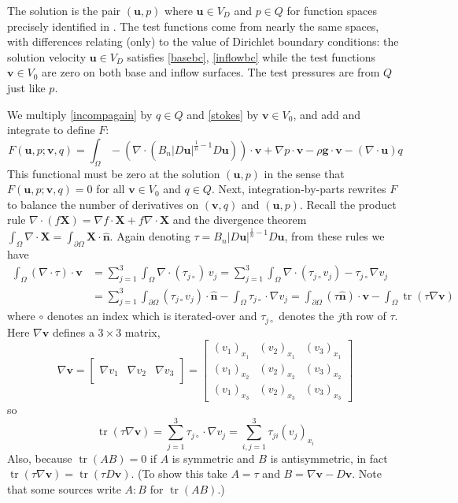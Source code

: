 \documentclass[letterpaper,final,12pt,reqno]{amsart}
\newcommand{\grad}{\nabla}
\newcommand{\trace}{\operatorname{tr}}
\newcommand{\hbn}{\hat{\mathbf{n}}}
\newcommand{\bu}{\mathbf{u}}
\newcommand{\bv}{\mathbf{v}}
\newcommand{\bX}{\mathbf{X}}
\begin{document}
The solution is the pair $(\bu,p)$ where $\bu\in V_D$ and $p \in Q$ for function spaces precisely identified in \cite{JouvetRappaz2011}.  The test functions come from nearly the same spaces, with differences relating (only) to the value of Dirichlet boundary conditions: the solution velocity $\bu\in V_D$ satisfies \eqref{basebc}, \eqref{inflowbc} while the test functions $\bv\in V_0$ are zero on both base and inflow surfaces.  The test pressures are from $Q$ just like $p$.

We multiply \eqref{incompagain} by $q\in Q$ and \eqref{stokes} by $\bv\in V_0$, and add and integrate to define $F$:
\begin{equation}
F(\bu,p;\bv,q) = \int_\Omega - \left(\nabla \cdot \left(B_n |D\bu|^{\frac{1}{n} - 1} D\bu\right)\right)\cdot \bv + \nabla p \cdot \bv - \rho \mathbf{g} \cdot \bv - \left(\nabla \cdot \bu\right) q \label{nonfuncone}
\end{equation}
This functional must be zero at the solution $(\bu,p)$ in the sense that $F(\bu,p;\bv,q) = 0$ for all  $\bv\in V_0$ and $q\in Q$.  Next, integration-by-parts rewrites $F$ to balance the number of derivatives on $(\bv,q)$ and $(\bu,p)$.  Recall the product rule $\nabla \cdot(f\bX) = \grad f\cdot \bX + f \nabla \cdot \bX$ and the divergence theorem $\int_\Omega \nabla \cdot \bX = \int_{\partial \Omega} \bX \cdot \hbn$.  Again denoting $\tau = B_n |D\bu|^{\frac{1}{n} - 1} D\bu$, from these rules we have
\begin{align*}
\int_\Omega \left(\nabla \cdot \tau\right)\cdot \bv &= \sum_{j=1}^3 \int_\Omega \nabla \cdot (\tau_{j\circ})\, v_j = \sum_{j=1}^3 \int_\Omega \nabla \cdot (\tau_{j\circ} v_j) - \tau_{j\circ} \nabla v_j \\
  &= \sum_{j=1}^3 \int_{\partial \Omega} (\tau_{j\circ} v_j) \cdot \hbn - \int_\Omega \tau_{j\circ} \cdot \nabla v_j = \int_{\partial \Omega} (\tau \hbn)\cdot \bv - \int_\Omega \trace(\tau \nabla \bv)
\end{align*}
where $\circ$ denotes an index which is iterated-over and $\tau_{j\circ}$ denotes the $j$th row of $\tau$.  Here $\grad\bv$ defines a $3\times 3$ matrix,
\newcommand{\trefthree}[3]{\left[\begin{array}{c|c|c} & & \\ #1 & #2 & #3 \\ & & \end{array}\right]}
    $$\grad \bv = \trefthree{\grad v_1}{\grad v_2}{\grad v_3} = \begin{bmatrix}
    (v_1)_{x_1} & (v_2)_{x_1} & (v_3)_{x_1} \\
    (v_1)_{x_2} & (v_2)_{x_2} & (v_3)_{x_2} \\
    (v_1)_{x_3} & (v_2)_{x_3} & (v_3)_{x_3}
    \end{bmatrix}$$
so
    $$\trace(\tau \grad \bv) = \sum_{j=1}^3 \tau_{j\circ} \cdot \grad v_j = \sum_{i,j=1}^3 \tau_{ji} (v_j)_{x_i}$$
Also, because $\trace(AB)=0$ if $A$ is symmetric and $B$ is antisymmetric, in fact $\trace(\tau \grad \bv) = \trace(\tau D\bv)$.  (To show this take $A=\tau$ and $B=\grad\bv-D\bv$.  Note that some sources \cite{JouvetRappaz2011} write $A:B$ for $\trace(AB)$.)
\end{document}
